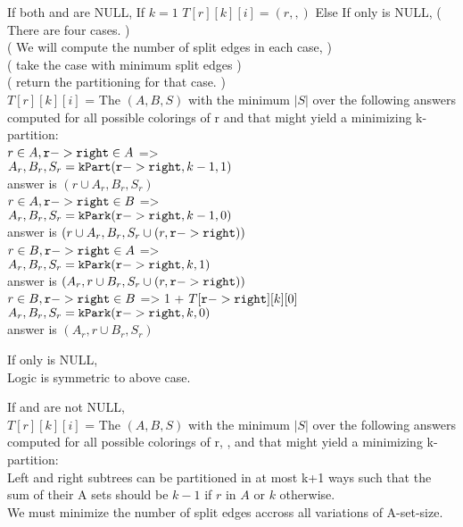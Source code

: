 \documentclass[11pt]{article}
\begin{document}
    If both \rleft and \rright are NULL,
        If $k=1$
            $T[r][k][i] = ({r}, {}, {})$
        Else
    If only \rleft is NULL,
        ( There are four cases. )\\
        ( We will compute the number of split edges in each case, )\\
        ( take the case with minimum split edges )\\
        ( return the partitioning for that case. )\\
        $T[r][k][i]$ = The $(A,B,S)$ with the minimum $|S|$ over the following answers computed for all possible colorings of r and \rright that might yield a minimizing k-partition:\\
          $r \in A, \mathtt{r->right } \in A$ =>\\
            $A_r, B_r, S_r = \mathtt{kPart}(\mathtt{r->right },k-1,1)$\\
            answer is $({r} \cup A_r, B_r, S_r)$\\
          $r \in A, \mathtt{r->right } \in B$ =>\\
            $A_r, B_r, S_r = \mathtt{kPark}(\mathtt{r->right },k-1,0)$\\
            answer is $({r} \cup A_r, B_r, S_r \cup {(r, \mathtt{r->right })})$\\
          $r \in B, \mathtt{r->right } \in A$ =>\\
            $A_r, B_r, S_r = \mathtt{kPark}(\mathtt{r->right },k,1)$\\
            answer is $(A_r,{r} \cup B_r, S_r \cup {(r, \mathtt{r->right })})$\\
          $r \in B, \mathtt{r->right } \in B$ => 1 + $T[\mathtt{r->right }][k][0]$\\
            $A_r, B_r, S_r = \mathtt{kPark}(\mathtt{r->right },k,0)$\\
            answer is $(A_r,{r} \cup B_r, S_r)$

    If only \rright is NULL,\\
        Logic is symmetric to above case.

    If \rleft and \rright are not NULL,\\
        $T[r][k][i]$ = The $(A,B,S)$ with the minimum $|S|$ over the following answers computed for all possible colorings of r, \rright, and \rleft that might yield a minimizing k-partition:\\
                Left and right subtrees can be partitioned in at most k+1 ways such that the sum of their A sets should be $k-1$ if $r$ in $A$ or $k$ otherwise.\\
                We must minimize the number of split edges accross all variations of A-set-size.
\end{document}
